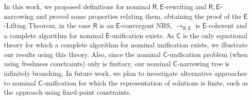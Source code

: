 \documentclass[submission,copyright,creativecommons]{eptcs}
\newcommand{\theory}[1]{\ensuremath{\mathsf{#1}}}
\theoremstyle{plain}
\theoremstyle{definition}
\theoremstyle{remark}
\begin{document}
In this work, we proposed definitions for nominal $\theory{R,E}$-rewriting and $\theory{R,E}$-narrowing and proved some properties relating them, obtaining the proof of the \theory{E}-Lifting Theorem, in the case \theory{R}  is an \theory{E}-convergent NRS, $\to_\theory{R,E}$ is \theory{E}-coherent and a complete algorithm for nominal \theory{E}-unification exists. %
As $\theory{C}$ is the only equational theory for which a complete algorithm for nominal unification exists, we illustrate our results using this theory. Also, since the nominal \theory{C}-unification problem (when using freshness constraints)  only is finitary, our nominal $\theory{C}$-narrowing tree is infinitely branching. In future work, we plan to investigate alternative approaches to nominal \theory{C}-unification for which the representation of solutions is finite, such as the approach using fixed-point constraints.






\end{document}
